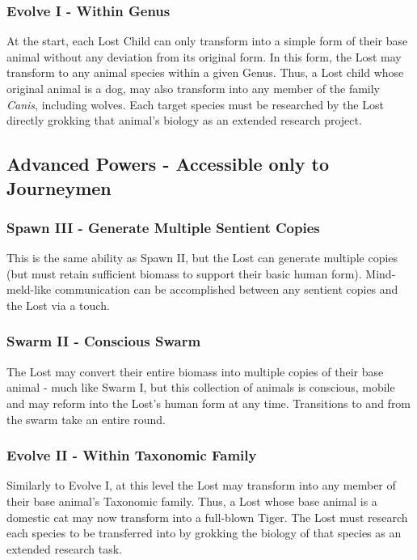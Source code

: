 \documentclass[letterpaper,serif]{rpg-module}
\begin{document}
\subsubsection{Evolve I - Within Genus}

At the start, each Lost Child can only transform into a simple form of their base animal without any deviation from its original form. In this form, the Lost may transform to any animal species within a given Genus. Thus, a Lost child whose original animal is a dog, may also transform into any member of the family \textit{Canis}, including wolves. Each target species must be researched by the Lost directly grokking that animal's biology as an extended research project.

\subsection{Advanced Powers - Accessible only to Journeymen}

\subsubsection{Spawn III - Generate Multiple Sentient Copies}

This is the same ability as Spawn II, but the Lost can generate multiple copies (but must retain sufficient biomass to support their basic human form). Mind-meld-like communication can be accomplished between any sentient copies and the Lost via a touch. 
\subsubsection{Swarm II - Conscious Swarm}

The Lost may convert their entire biomass into multiple copies of their base animal - much like Swarm I, but this collection of animals is conscious, mobile and may reform into the Lost's human form at any time. Transitions to and from the swarm take an entire round.

\subsubsection{Evolve II - Within Taxonomic Family}

Similarly to Evolve I, at this level the Lost may transform into any member of their base animal's Taxonomic family. Thus, a Lost whose base animal is a domestic cat may now transform into a full-blown Tiger. The Lost must research each species to be transferred into by grokking the biology of that species as an extended research task.   
\end{document}
